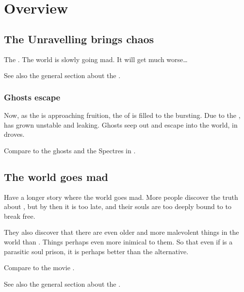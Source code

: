 \section{Overview}









\subsection{The Unravelling brings chaos}
The . 
The world is slowly going mad. 
It will get much worse\ldots{}

See also the general section about the . 





\subsubsection{Ghosts escape}
Now, as the  is approaching fruition, the \carcer{} of \Iquin{} is filled to the bursting. 
Due to the , \Iquin{} has grown unstable and leaking. 
Ghosts seep out and escape into the world, in droves. 

Compare to the ghosts and the Spectres in \cite{PhillipPullman:HisDarkMaterials}. 









\subsection{The world goes mad}
Have a longer story where the world goes mad. 
More people discover the truth about \iquin, but by then it is too late, and their souls are too deeply bound to \iquin to break free. 

They also discover that there are even older and more malevolent things in the world than \iquin.
Things perhaps even more inimical to them.
So that even if \iquin is a parasitic soul prison, it is perhaps better than the alternative. 

Compare to the movie \cite{Movie:IntheMouthofMadness}. 

See also the general section about the . 

